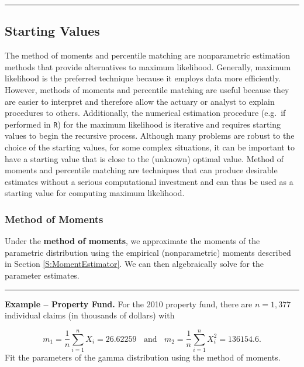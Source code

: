 \documentclass[]{book}
\theoremstyle{definition}
\theoremstyle{definition}
\theoremstyle{definition}
\theoremstyle{remark}
\begin{document}
\begin{center}\rule{0.5\linewidth}{\linethickness}\end{center}

\subsection{Starting Values}\label{starting-values}

The method of moments and percentile matching are nonparametric
estimation methods that provide alternatives to maximum likelihood.
Generally, maximum likelihood is the preferred technique because it
employs data more efficiently. However, methods of moments and
percentile matching are useful because they are easier to interpret and
therefore allow the actuary or analyst to explain procedures to others.
Additionally, the numerical estimation procedure (e.g.~if performed in
\texttt{R}) for the maximum likelihood is iterative and requires
starting values to begin the recursive process. Although many problems
are robust to the choice of the starting values, for some complex
situations, it can be important to have a starting value that is close
to the (unknown) optimal value. Method of moments and percentile
matching are techniques that can produce desirable estimates without a
serious computational investment and can thus be used as a starting
value for computing maximum likelihood.

\subsubsection{Method of Moments}\label{method-of-moments}

Under the \textbf{method of moments}, we approximate the moments of the
parametric distribution using the empirical (nonparametric) moments
described in Section \ref{S:MomentEstimator}. We can then algebraically
solve for the parameter estimates.

\begin{center}\rule{0.5\linewidth}{\linethickness}\end{center}

\textbf{Example -- Property Fund.} For the 2010 property fund, there are
\(n=1,377\) individual claims (in thousands of dollars) with

\[m_1 = \frac{1}{n} \sum_{i=1}^n X_i = 26.62259 \ \ \ \
\text{and} \ \ \ \
 m_2 = \frac{1}{n} \sum_{i=1}^n X_i^2 = 136154.6 .\] Fit the parameters
of the gamma distribution using the method of moments.
\end{document}
